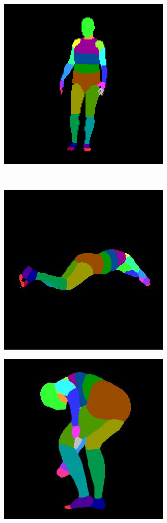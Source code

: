 \documentclass[12pt,a4paper]{article}
\begin{document}
\begin{figure}
\begin{subfigure}{.19\textwidth}
\end{subfigure}
\begin{subfigure}{.19\textwidth}
  \centering
  \includegraphics[scale=0.3]{ung_144_34_c0008_segm_39_gt.png}
\end{subfigure}\\
\begin{subfigure}{.2\textwidth}
\centering
  \includegraphics[scale=0.3]{ung_126_09_c0008_85.jpg}
\end{subfigure}%
\begin{subfigure}{.19\textwidth}
  \centering
  \includegraphics[scale=0.3]{ung_137_31_c0008_77.jpg}

\end{subfigure}
\end{figure}
\end{document}
